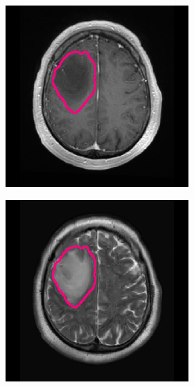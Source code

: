 \begin{subappendices}
\begin{figure}[htbp]
\begin{subfigure}[b]{0.95\textwidth}
\begin{subfigure}[b]{0.215\textwidth}
        \includegraphics[width=\textwidth, clip, trim=2.5cm 0.5cm 2.5cm 0.5cm]{Figures/Random_segs/T1GD_TCGA-HT-7475.png}
        \end{subfigure}
        \hfill
        \begin{subfigure}[b]{0.215\textwidth}
        \includegraphics[width=\textwidth, clip, trim=2.5cm 0.5cm 2.5cm 0.5cm]{Figures/Random_segs/T2_TCGA-HT-7475.png}

\end{subfigure}
\end{subfigure}
\end{figure}
\end{subappendices}
